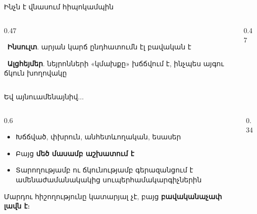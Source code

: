 \begin{frame}{Ինչն է վնասում հիպոկամպին}
  \begin{columns}[T]
    \begin{column}{0.47\textwidth}
      \begin{card}\ \textbf{Ինսուլտ}. արյան կարճ ընդհատումն էլ բավական է\end{card}
      \begin{card}\ \textbf{Ալցհեյմեր}. նեյրոնների «կմախքը» խճճվում է, ինչպես այգու ճկուն խողովակը\end{card}
    \end{column}
    \begin{column}{0.47\textwidth}
    \end{column}
  \end{columns}
\end{frame}

\begin{frame}{Եվ այնուամենայնիվ...}
  \begin{columns}[c]
    \begin{column}{0.6\textwidth}
      \begin{itemize}
        \item Խճճված, փխրուն, անհետևողական, եսասեր
        \item Բայց \textbf{մեծ մասամբ աշխատում է}
        \item Տարողությամբ ու ճկունությամբ գերազանցում է ամենաժամանակակից սուպերհամակարգիչներին
      \end{itemize}
      \vspace{3mm}
      \begin{bookquote}
        Մարդու հիշողությունը կատարյալ չէ, բայց \textbf{բավականաչափ լավն է}։
      \end{bookquote}
    \end{column}
    \begin{column}{0.34\textwidth}
      \centering{}
    \end{column}
  \end{columns}
\end{frame}
